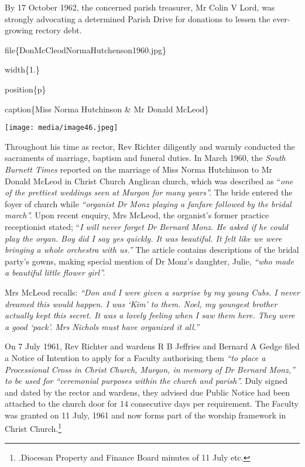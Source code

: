 By 17 October 1962, the concerned parish treasurer, Mr Colin V Lord, was strongly advocating a determined Parish Drive for donations to lessen the ever-growing rectory debt.

file\{DonMcCleodNormaHutchenson1960.jpg\}

width\{1.\}

position\{p\}

caption\{Miss Norma Hutchinson \& Mr Donald McLeod\}

\texttt{[image: media/image46.jpeg]}

Throughout his time as rector, Rev Richter diligently and warmly conducted the sacraments of marriage, baptism and funeral duties. In March 1960, the \emph{South Burnett Times} reported on the marriage of Miss Norma Hutchinson to Mr Donald McLeod in Christ Church Anglican church, which was described as ``\emph{one of the prettiest weddings seen at Murgon for many years''.} The bride entered the foyer of church while \emph{``organist Dr Monz playing a fanfare followed by the bridal march''.} Upon recent enquiry, Mrs McLeod, the organist's former practice receptionist stated; ``\emph{I will never forget Dr Bernard Monz. He asked if he could play the organ. Boy did I say yes quickly. It was beautiful. It felt like we were bringing a whole orchestra with us.''} The article contains descriptions of the bridal party's gowns, making special mention of Dr Monz's daughter, Julie, \emph{``who made a beautiful little flower girl''.}

Mrs McLeod recalls: \emph{``Don and I were given a surprise by my young Cubs. I never dreamed this would happen. I was `Kim' to them. Noel, my youngest brother actually kept this secret. It was a lovely feeling when I saw them here. They were a good `pack'. Mrs Nichols must have organized it all.''}

On 7 July 1961, Rev Richter and wardens R B Jeffries and Bernard A Gedge filed a Notice of Intention to apply for a Faculty authorising them \emph{``to place a Processional Cross in Christ Church, Murgon, in memory of Dr Bernard Monz,'' to be used for ``ceremonial purposes within the church and parish''.} Duly signed and dated by the rector and wardens, they advised due Public Notice had been attached to the church door for 14 consecutive days per requirement. The Faculty was granted on 11 July, 1961 and now forms part of the worship framework in Christ Church.\footnote{.Diocesan Property and Finance Board minutes of 11 July etc.}

